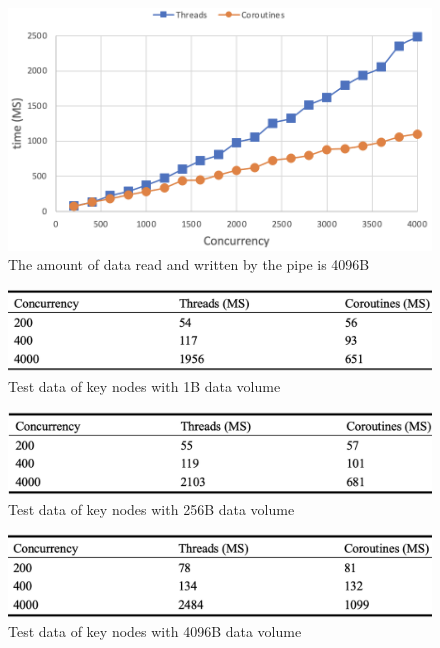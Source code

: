 \documentclass[10pt]{article}
\begin{document}
\begin{figure}[ht]
\begin{center}
\centerline{\includegraphics[width=\columnwidth]{4096B.png}}
\caption{The amount of data read and written by the pipe is 4096B}
\label{4096B}
\end{center}
\end{figure}

\begin{figure}[ht]
\begin{center}
\centerline{\includegraphics[width=\columnwidth]{1B_table.png}}
\caption{Test data of key nodes with 1B data volume}
\label{bayespic}
\end{center}
\end{figure}

\begin{figure}[ht]
\begin{center}
\centerline{\includegraphics[width=\columnwidth]{256B_table.png}}
\caption{Test data of key nodes with 256B data volume}
\label{256B_table}
\end{center}
\end{figure}

\begin{figure}[ht]
\begin{center}
\centerline{\includegraphics[width=\columnwidth]{4096B_table.png}}
\caption{Test data of key nodes with 4096B data volume}
\label{4096B_table}
\end{center}
\end{figure}
\end{document}
